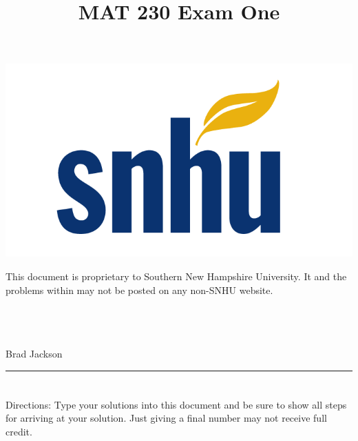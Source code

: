 \documentclass{amsart}
\theoremstyle{definition}
\theoremstyle{Exercise}
\theoremstyle{remark}
\theoremstyle{rule}
\numberwithin{equation}{section}
\begin{document}
\title{\sf MAT 230 Exam One}%


\begin{center}
\includegraphics[scale=.1]{snhu_logo.png}
\end{center}

\maketitle
This document is proprietary to Southern New Hampshire University. It and the problems within may not be posted on any non-SNHU website.\\\\\\\\
\begin{center}
Brad Jackson
\end{center}

\begin{center}
\rule{\textwidth}{0.4pt}
\end{center}
\newpage
\section*{}
\section*{}
Directions: Type your solutions into this document and be sure to show all steps for arriving at your solution. Just giving a final number may not receive full credit.
\\
\end{document}
